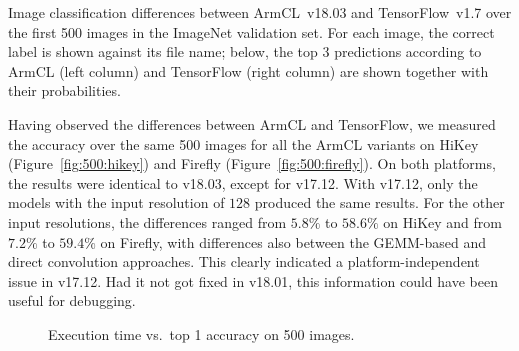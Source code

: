 \documentclass[sigplan]{acmart}
\begin{document}
\begin{table}[htb]
  \caption{Image classification differences between ArmCL~v18.03 and
TensorFlow~v1.7 over the first 500 images in the ImageNet validation set. For
each image, the correct label is shown against its file name; below, the top 3
predictions according to ArmCL (left column) and TensorFlow (right column) are
shown together with their probabilities.}

  \label{tab:500}
\end{table}

Having observed the differences between ArmCL and TensorFlow, we measured the
accuracy over the same 500 images for all the ArmCL variants on HiKey
(Figure~\ref{fig:500:hikey}) and Firefly (Figure~\ref{fig:500:firefly}).
%
On both platforms, the results were identical to v18.03, except for v17.12.
%
With v17.12, only the models with the input resolution of $128$ produced the same
results. For the other input resolutions, the differences ranged from $5.8\%$
to $58.6\%$ on HiKey and from $7.2\%$ to $59.4\%$ on Firefly, with differences
also between the GEMM-based and direct convolution approaches.
%
This clearly indicated a platform-independent issue in v17.12.
%
Had it not got fixed in v18.01, this information could have been useful for
debugging.
%

\begin{figure}[tp]
  \centering
  \hfill
  \caption{Execution time vs.\ top 1 accuracy on 500 images.\label{fig:500}}
\end{figure}
\end{document}
